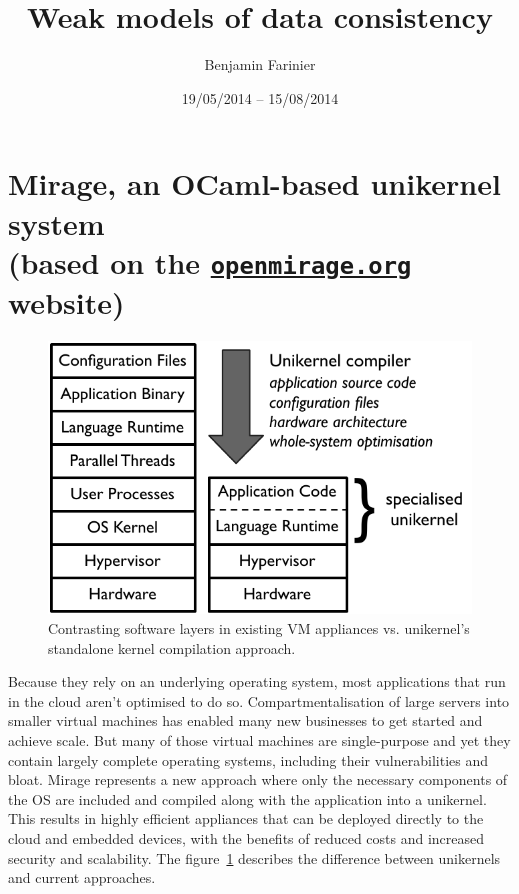 \documentclass{article}
\title{Weak models of data consistency}
\author{Benjamin Farinier}
\date{19/05/2014 -- 15/08/2014}
\newcommand{\mirage}{Mirage\xspace}
\newcommand{\ocaml}{OCaml\xspace}
\begin{document}
\maketitle
\tableofcontents

\section[\mirage, an \ocaml-based unikernel system]{\mirage, an \ocaml-based unikernel system\\\normalsize\normalfont(based on the \href{http://openmirage.org}{\texttt{openmirage.org}} website)}

\begin{figure}[hbt]
\centering
\includegraphics[scale=0.8]{mirage-stack.pdf}
\caption{Contrasting software layers in existing VM appliances vs. unikernel’s standalone kernel compilation approach.}
\label{miragestackgraph}
\end{figure}

Because they rely on an underlying operating system, most applications that run in the cloud aren't optimised to do so.
Compartmentalisation of large servers into smaller virtual machines has enabled many new businesses to get started and achieve scale.
But many of those virtual machines are single-purpose and yet they contain largely complete operating systems, including their vulnerabilities and bloat.
\mirage represents a new approach where only the necessary components of the OS are included and compiled along with the application into a unikernel.
This results in highly efficient appliances that can be deployed directly to the cloud and embedded devices, with the benefits of reduced costs and increased security and scalability. The figure~\ref{miragestackgraph} describes the difference between unikernels and current approaches.
\end{document}

